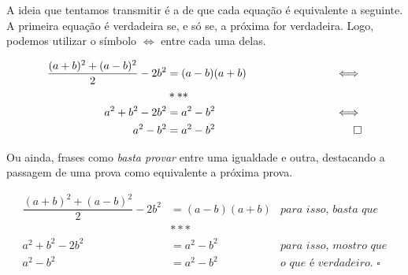 

A ideia que tentamos transmitir é a de que cada equação é equivalente a seguinte. A primeira equação é verdadeira se, e só se, a próxima for verdadeira. Logo, podemos utilizar o símbolo $\iff$ entre cada uma delas.

  \begin{equation*}
    \begin{aligned}
      \dfrac{(a+b)^2+(a-b)^2}{2}-2b^2 &= (a-b)(a+b) &\hspace{25mm}\iff \\
      &***&\\
      a^2+b^2-2b^2 &= a^2-b^2 &\hspace{25mm}\iff \\
      a^2-b^2 &= a^2-b^2 & \hspace{25mm}\square
    \end{aligned}
  \end{equation*}

Ou ainda, frases como \textit{basta provar} entre uma igualdade e outra, destacando a passagem de uma prova como equivalente a próxima prova.

  \begin{equation*}
    \begin{aligned}
      \dfrac{(a+b)^2+(a-b)^2}{2}-2b^2 &= (a-b)(a+b) & \textit{para isso, basta que} \\
      &***&\\
      a^2+b^2-2b^2 &= a^2-b^2 & \textit{para isso, mostro que} \\
      a^2-b^2 &= a^2-b^2 & \textit{o que é verdadeiro. } \square
    \end{aligned}
  \end{equation*}

